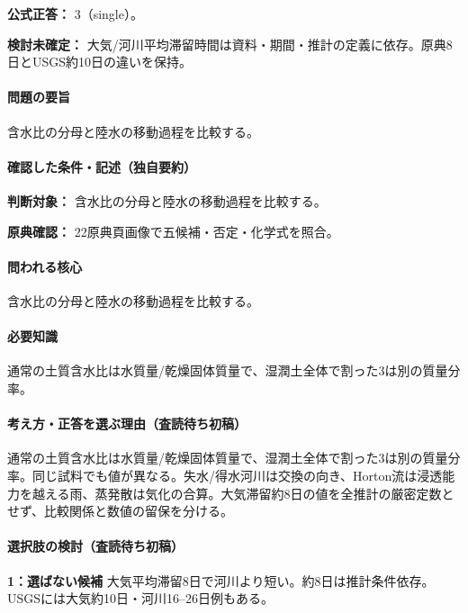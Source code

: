 \textbf{公式正答：} 3（single）。

\par\textbf{検討未確定：} 大気/河川平均滞留時間は資料・期間・推計の定義に依存。原典8日とUSGS約10日の違いを保持。

\paragraph{問題の要旨} 含水比の分母と陸水の移動過程を比較する。

\paragraph{確認した条件・記述（独自要約）}\mbox{}\par

\noindent\textbf{判断対象：} 含水比の分母と陸水の移動過程を比較する。\par

\noindent\textbf{原典確認：} 22原典頁画像で五候補・否定・化学式を照合。\par

\paragraph{問われる核心} 含水比の分母と陸水の移動過程を比較する。

\paragraph{必要知識} 通常の土質含水比は水質量/乾燥固体質量で、湿潤土全体で割った3は別の質量分率。

\paragraph{考え方・正答を選ぶ理由（査読待ち初稿）} 通常の土質含水比は水質量/乾燥固体質量で、湿潤土全体で割った3は別の質量分率。同じ試料でも値が異なる。失水/得水河川は交換の向き、Horton流は浸透能力を越える雨、蒸発散は気化の合算。大気滞留約8日の値を全推計の厳密定数とせず、比較関係と数値の留保を分ける。

\paragraph{選択肢の検討（査読待ち初稿）}\mbox{}\par

\noindent\textbf{1：選ばない候補} 大気平均滞留8日で河川より短い。約8日は推計条件依存。USGSには大気約10日・河川16–26日例もある。\par

